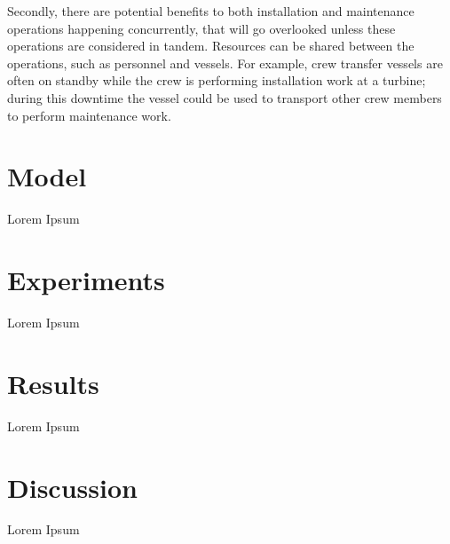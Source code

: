 \documentclass[a4paper,12pt]{report}
\begin{document}
Secondly, there are potential benefits to both installation and maintenance operations happening concurrently, that will go overlooked unless these operations are considered in tandem. Resources can be shared between the operations, such as personnel and vessels. For example, crew transfer vessels are often on standby while the crew is performing installation work at a turbine; during this downtime the vessel could be used to transport other crew members to perform maintenance work. 

\section{Model}
Lorem Ipsum %

\section{Experiments}
Lorem Ipsum %

\section{Results}
Lorem Ipsum %

\section{Discussion}
Lorem Ipsum %

\pagebreak



\end{document}
